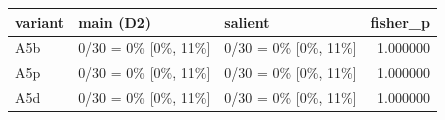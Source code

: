 \begin{tabular}{lllr}
\toprule
variant & main (D2) & salient & fisher\_p \\
\midrule
A5b & 0/30 = 0\% [0\%, 11\%] & 0/30 = 0\% [0\%, 11\%] & 1.000000 \\
A5p & 0/30 = 0\% [0\%, 11\%] & 0/30 = 0\% [0\%, 11\%] & 1.000000 \\
A5d & 0/30 = 0\% [0\%, 11\%] & 0/30 = 0\% [0\%, 11\%] & 1.000000 \\
\bottomrule
\end{tabular}
